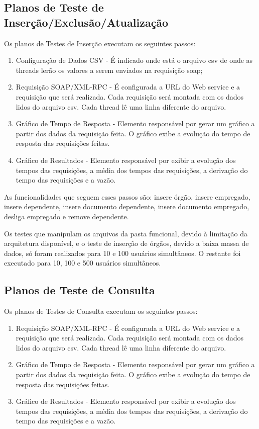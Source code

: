 \subsection{Planos de Teste de Inserção/Exclusão/Atualização}

Os planos de Testes de Inserção executam os seguintes passos:

\begin{enumerate}
\item Configuração de Dados CSV - É indicado onde está o arquivo csv de onde as threads lerão os valores a serem enviados na requisição soap;
\item Requisição SOAP/XML-RPC - É configurada a URL do Web service e a requisição que será realizada. Cada requisição será montada com os dados lidos do arquivo csv. Cada thread lê uma linha diferente do arquivo.
\item Gráfico de Tempo de Resposta -  Elemento responsável por gerar um gráfico a partir dos dados da requisição feita. O gráfico exibe a  evolução do tempo de resposta das requisições feitas.
\item Gráfico de Resultados - Elemento responsável por exibir a evolução dos tempos das requisições, a média dos tempos das requisições, a derivação do tempo das requisições e a vazão.
\end{enumerate}

As funcionalidades que seguem esses passos são: insere órgão, insere empregado, insere dependente, insere documento dependente, insere documento empregado, desliga empregado e remove dependente.

Os testes que manipulam os arquivos da pasta funcional, devido à limitação da arquitetura disponível, e o teste de inserção de órgãos, devido a baixa massa de dados, só foram realizados para 10 e 100 usuários simultâneos. O restante foi executado para 10, 100 e 500 usuários simultâneos.

\subsection{Planos de Teste de Consulta}

Os planos de Testes de Consulta executam os seguintes passos:

\begin{enumerate}
\item Requisição SOAP/XML-RPC - É configurada a URL do Web service e a requisição que será realizada. Cada requisição será montada com os dados lidos do arquivo csv. Cada thread lê uma linha diferente do arquivo.
\item Gráfico de Tempo de Resposta -  Elemento responsável por gerar um gráfico a partir dos dados da requisição feita. O gráfico exibe a  evolução do tempo de resposta das requisições feitas.
\item Gráfico de Resultados - Elemento responsável por exibir a evolução dos tempos das requisições, a média dos tempos das requisições, a derivação do tempo das requisições e a vazão.
\end{enumerate}

